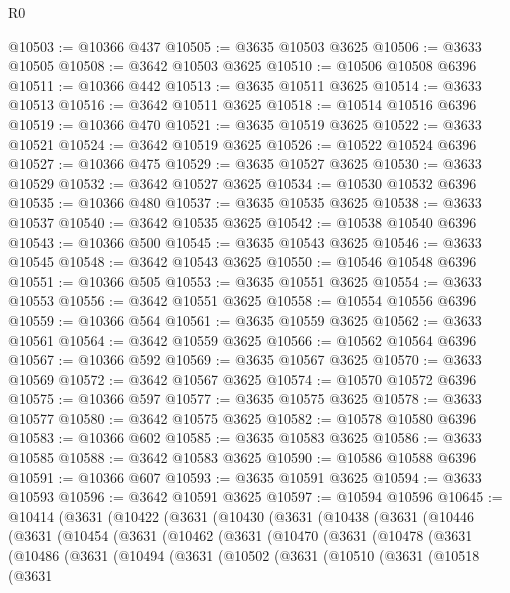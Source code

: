 \begin{lexlean}{R0}
\begin{coremodule}
@10503 := @10366 @437
@10505 := @3635 @10503 @3625
@10506 := @3633 @10505
@10508 := @3642 @10503 @3625
@10510 := @10506 @10508 @6396
@10511 := @10366 @442
@10513 := @3635 @10511 @3625
@10514 := @3633 @10513
@10516 := @3642 @10511 @3625
@10518 := @10514 @10516 @6396
@10519 := @10366 @470
@10521 := @3635 @10519 @3625
@10522 := @3633 @10521
@10524 := @3642 @10519 @3625
@10526 := @10522 @10524 @6396
@10527 := @10366 @475
@10529 := @3635 @10527 @3625
@10530 := @3633 @10529
@10532 := @3642 @10527 @3625
@10534 := @10530 @10532 @6396
@10535 := @10366 @480
@10537 := @3635 @10535 @3625
@10538 := @3633 @10537
@10540 := @3642 @10535 @3625
@10542 := @10538 @10540 @6396
@10543 := @10366 @500
@10545 := @3635 @10543 @3625
@10546 := @3633 @10545
@10548 := @3642 @10543 @3625
@10550 := @10546 @10548 @6396
@10551 := @10366 @505
@10553 := @3635 @10551 @3625
@10554 := @3633 @10553
@10556 := @3642 @10551 @3625
@10558 := @10554 @10556 @6396
@10559 := @10366 @564
@10561 := @3635 @10559 @3625
@10562 := @3633 @10561
@10564 := @3642 @10559 @3625
@10566 := @10562 @10564 @6396
@10567 := @10366 @592
@10569 := @3635 @10567 @3625
@10570 := @3633 @10569
@10572 := @3642 @10567 @3625
@10574 := @10570 @10572 @6396
@10575 := @10366 @597
@10577 := @3635 @10575 @3625
@10578 := @3633 @10577
@10580 := @3642 @10575 @3625
@10582 := @10578 @10580 @6396
@10583 := @10366 @602
@10585 := @3635 @10583 @3625
@10586 := @3633 @10585
@10588 := @3642 @10583 @3625
@10590 := @10586 @10588 @6396
@10591 := @10366 @607
@10593 := @3635 @10591 @3625
@10594 := @3633 @10593
@10596 := @3642 @10591 @3625
@10597 := @10594 @10596
@10645 := @10414
    (@3631
      (@10422
        (@3631
          (@10430
            (@3631
              (@10438
                (@3631
                  (@10446
                    (@3631
                      (@10454
                        (@3631
                          (@10462
                            (@3631
                              (@10470
                                (@3631
                                  (@10478
                                    (@3631
                                      (@10486
                                        (@3631
                                          (@10494
                                            (@3631
                                              (@10502
                                                (@3631
                                                  (@10510
                                                    (@3631
                                                      (@10518
                                                        (@3631

\end{coremodule}
\end{lexlean}
